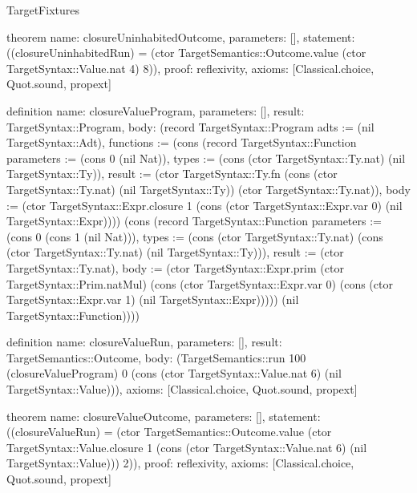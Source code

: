 \begin{lexlean}{TargetFixtures}
\begin{semanticmodule}
theorem{
  name: closureUninhabitedOutcome,
  parameters: [],
  statement: ((closureUninhabitedRun) = (ctor TargetSemantics::Outcome.value (ctor TargetSyntax::Value.nat 4) 8)),
  proof: reflexivity{},
  axioms: [Classical.choice, Quot.sound, propext]
}

definition{
  name: closureValueProgram,
  parameters: [],
  result: TargetSyntax::Program,
  body: (record TargetSyntax::Program {adts := (nil TargetSyntax::Adt), functions := (cons (record TargetSyntax::Function {parameters := (cons 0 (nil Nat)), types := (cons (ctor TargetSyntax::Ty.nat) (nil TargetSyntax::Ty)), result := (ctor TargetSyntax::Ty.fn (cons (ctor TargetSyntax::Ty.nat) (nil TargetSyntax::Ty)) (ctor TargetSyntax::Ty.nat)), body := (ctor TargetSyntax::Expr.closure 1 (cons (ctor TargetSyntax::Expr.var 0) (nil TargetSyntax::Expr)))}) (cons (record TargetSyntax::Function {parameters := (cons 0 (cons 1 (nil Nat))), types := (cons (ctor TargetSyntax::Ty.nat) (cons (ctor TargetSyntax::Ty.nat) (nil TargetSyntax::Ty))), result := (ctor TargetSyntax::Ty.nat), body := (ctor TargetSyntax::Expr.prim (ctor TargetSyntax::Prim.natMul) (cons (ctor TargetSyntax::Expr.var 0) (cons (ctor TargetSyntax::Expr.var 1) (nil TargetSyntax::Expr))))}) (nil TargetSyntax::Function)))})
}

definition{
  name: closureValueRun,
  parameters: [],
  result: TargetSemantics::Outcome,
  body: (TargetSemantics::run 100 (closureValueProgram) 0 (cons (ctor TargetSyntax::Value.nat 6) (nil TargetSyntax::Value))),
  axioms: [Classical.choice, Quot.sound, propext]
}

theorem{
  name: closureValueOutcome,
  parameters: [],
  statement: ((closureValueRun) = (ctor TargetSemantics::Outcome.value (ctor TargetSyntax::Value.closure 1 (cons (ctor TargetSyntax::Value.nat 6) (nil TargetSyntax::Value))) 2)),
  proof: reflexivity{},
  axioms: [Classical.choice, Quot.sound, propext]
}


\end{semanticmodule}
\end{lexlean}
